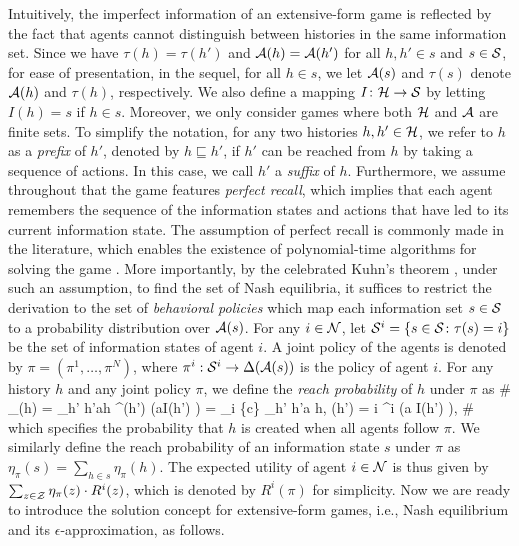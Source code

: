 Intuitively, the imperfect information of  
an extensive-form game is reflected by the fact that  agents cannot distinguish between histories in the same information set. 
Since we have $\tau(h) = \tau(h') $ and  $\mathcal{A} (h) = \mathcal{A} (h')$ for all $h,h'\in s$ and $s\in{\mathcal{S}}$,  
for ease of presentation,  in the sequel, for all $h \in s$, 
we let $\mathcal{A}(s) $ and $\tau(s)$ denote  $\mathcal{A} (h)$ and $\tau(h)$, respectively. We also define a mapping $I \colon \mathcal{H} \rightarrow {\mathcal{S}}$ by letting $I (h) = s$ if $h \in s$. 
Moreover, we only consider games   where both  $\mathcal{H}$  and $\mathcal{A}$ are   finite sets. To simplify the notation, for any two histories $h, h' \in \mathcal{H}$, we refer to $h$ as a \emph{prefix} of $h'$, denoted by $h  \sqsubseteq h'$,   if $h'$ can be reached from $h$ by taking a sequence of actions. In this case, we call $h'$ a \emph{suffix} of $h$. 
Furthermore, we assume throughout that 
the game features  \emph{perfect recall}, which  implies that  each agent remembers the sequence of the information states and  actions that have led to  its current information state.
The assumption of perfect recall is commonly made in the literature, which enables the existence of polynomial-time algorithms for solving the game \cite{koller1992complexity}. 
More importantly, by the celebrated 
Kuhn's theorem \cite{kuhn1953extensive}, under such an assumption, to find the set of  
Nash equilibria, it suffices to    restrict  the derivation  to the set of \emph{behavioral policies} which map each information set $s \in {\mathcal{S}}$ to a probability distribution over $\mathcal{A} (s)$. For any $i \in \mathcal{N}$, let ${\mathcal{S}}^i = \{ s\in {\mathcal{S}} \colon \tau(s) = i \}$ be the set of information states of agent $i$. A joint policy of the agents is denoted by  $\pi = ( \pi^1, \ldots, \pi^N )  $, where  $\pi^i:{\mathcal{S}}^i\to \Delta ( \mathcal{A} (s) )$ is the policy of agent $i$. 
For any history $h$ and any joint policy $\pi$, we define the 
 \emph{reach probability} of $h$ under $\pi$  as 
\#\label{eq:reach_prod}
\eta _\pi (h) = \prod  _{h' \colon h'a\sqsubseteq h } \pi^{\tau(h')}    (a\given I(h')   ) =  \prod_{i \in \cN \cup \{c\}} \prod_{h' \colon h'a \sqsubseteq h, \tau(h') = i } \pi^i   (a \given I(h')  ),
\# 
 which specifies the probability that $h$ is created when all agents follow $\pi$. 
 We similarly define the reach probability of an information state $s $ under $\pi$ as $\eta_\pi (s) = \sum_{h \in s} \eta_\pi (h)$. The expected utility of agent $i \in \mathcal{N}$ is  thus given by  $     \sum_{ z \in \mathcal{Z} } \eta_\pi(z) \cdot R^i (z) $, which is denoted by $R^i ( \pi)  $ for simplicity. 
 Now we are ready to introduce  the solution concept for  extensive-form games, i.e., 
Nash equilibrium and its $\epsilon$-approximation, as follows. 


